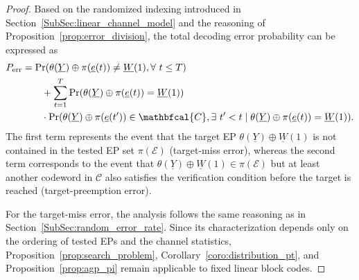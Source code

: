 \documentclass[letterpaper,draftclsnofoot,onecolumn]{IEEEtran}
\begin{document}
\begin{figure}[omitted: a diagram of this paper's results, not reproduced here]\label{fig:tikz2}\end{figure}
\begin{proof}
    Based on the randomized indexing introduced in Section~\ref{SubSec:linear_channel_model} and the reasoning of Proposition~\ref{prop:error_division}, the total decoding error probability can be expressed as
    \begin{align}
        P_{\text{err}} & = \Pr(\theta(\underline{Y})\oplus \pi(\underline{e}(t))\neq \underline{W}(1),\forall\ t\leq  T) \notag\\
        & \quad \quad + \sum_{t=1}^{T}\Pr(\theta(\underline{Y})\oplus \pi(\underline{e}(t)) = \underline{W}(1)) \notag\\
        & \quad \quad \cdot\Pr(\theta(\underline{Y})\oplus \pi(\underline{e}(t'))\in \mathbfcal{C},\exists\ t'< t \mid \theta(\underline{Y})\oplus \pi(\underline{e}(t))=\underline{W}(1)). \label{eq:err_div_linear}
    \end{align}
    The first term represents the event that the target EP $\theta(\underline{Y}) \oplus \underline{W}(1)$ is not contained in the tested EP set $\pi(\mathcal{E})$ (target-miss error), whereas the second term corresponds to the event that $\theta(\underline{Y}) \oplus \underline{W}(1)\in\pi(\mathcal{E})$ but at least another codeword in $\mathcal{C}$ also satisfies the verification condition before the target is reached (target-preemption error).

    For the target-miss error, the analysis follows the same reasoning as in Section~\ref{SubSec:random_error_rate}. Since its characterization depends only on the ordering of tested EPs and the channel statistics, Proposition~\ref{prop:search_problem}, Corollary~\ref{coro:distribution_pt}, and Proposition~\ref{prop:agp_pi} remain applicable to fixed linear block codes.


\end{proof}
\end{document}
